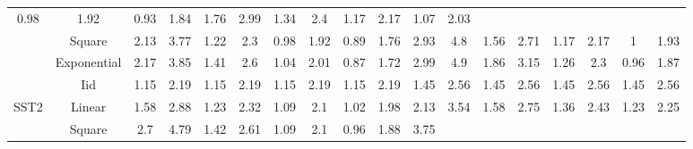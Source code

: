 \begin{table*}[t]
{\begin{tabular}{|c|c|cccccccc|cccccccc|}
  \multicolumn{1}{c|}{0.98} &
  \multicolumn{1}{c|}{1.92} &
  \multicolumn{1}{c|}{0.93} &
  1.84 &
  \multicolumn{1}{c|}{1.76} &
  \multicolumn{1}{c|}{2.99} &
  \multicolumn{1}{c|}{1.34} &
  \multicolumn{1}{c|}{2.4} &
  \multicolumn{1}{c|}{1.17} &
  \multicolumn{1}{c|}{2.17} &
  \multicolumn{1}{c|}{1.07} &
  2.03 \\
 &
  Square &
  \multicolumn{1}{c|}{2.13} &
  \multicolumn{1}{c|}{3.77} &
  \multicolumn{1}{c|}{1.22} &
  \multicolumn{1}{c|}{2.3} &
  \multicolumn{1}{c|}{0.98} &
  \multicolumn{1}{c|}{1.92} &
  \multicolumn{1}{c|}{0.89} &
  1.76 &
  \multicolumn{1}{c|}{2.93} &
  \multicolumn{1}{c|}{4.8} &
  \multicolumn{1}{c|}{1.56} &
  \multicolumn{1}{c|}{2.71} &
  \multicolumn{1}{c|}{1.17} &
  \multicolumn{1}{c|}{2.17} &
  \multicolumn{1}{c|}{1} &
  1.93 \\
 &
  Exponential &
  \multicolumn{1}{c|}{2.17} &
  \multicolumn{1}{c|}{3.85} &
  \multicolumn{1}{c|}{1.41} &
  \multicolumn{1}{c|}{2.6} &
  \multicolumn{1}{c|}{1.04} &
  \multicolumn{1}{c|}{2.01} &
  \multicolumn{1}{c|}{0.87} &
  1.72 &
  \multicolumn{1}{c|}{2.99} &
  \multicolumn{1}{c|}{4.9} &
  \multicolumn{1}{c|}{1.86} &
  \multicolumn{1}{c|}{3.15} &
  \multicolumn{1}{c|}{1.26} &
  \multicolumn{1}{c|}{2.3} &
  \multicolumn{1}{c|}{0.96} &
  1.87 \\ \hline
 &
  Iid &
  \multicolumn{1}{c|}{1.15} &
  \multicolumn{1}{c|}{2.19} &
  \multicolumn{1}{c|}{1.15} &
  \multicolumn{1}{c|}{2.19} &
  \multicolumn{1}{c|}{1.15} &
  \multicolumn{1}{c|}{2.19} &
  \multicolumn{1}{c|}{1.15} &
  2.19 &
  \multicolumn{1}{c|}{1.45} &
  \multicolumn{1}{c|}{2.56} &
  \multicolumn{1}{c|}{1.45} &
  \multicolumn{1}{c|}{2.56} &
  \multicolumn{1}{c|}{1.45} &
  \multicolumn{1}{c|}{2.56} &
  \multicolumn{1}{c|}{1.45} &
  2.56 \\
\multirow{2}{*}{SST2} &
  Linear &
  \multicolumn{1}{c|}{1.58} &
  \multicolumn{1}{c|}{2.88} &
  \multicolumn{1}{c|}{1.23} &
  \multicolumn{1}{c|}{2.32} &
  \multicolumn{1}{c|}{1.09} &
  \multicolumn{1}{c|}{2.1} &
  \multicolumn{1}{c|}{1.02} &
  1.98 &
  \multicolumn{1}{c|}{2.13} &
  \multicolumn{1}{c|}{3.54} &
  \multicolumn{1}{c|}{1.58} &
  \multicolumn{1}{c|}{2.75} &
  \multicolumn{1}{c|}{1.36} &
  \multicolumn{1}{c|}{2.43} &
  \multicolumn{1}{c|}{1.23} &
  2.25 \\
 &
  Square &
  \multicolumn{1}{c|}{2.7} &
  \multicolumn{1}{c|}{4.79} &
  \multicolumn{1}{c|}{1.42} &
  \multicolumn{1}{c|}{2.61} &
  \multicolumn{1}{c|}{1.09} &
  \multicolumn{1}{c|}{2.1} &
  \multicolumn{1}{c|}{0.96} &
  1.88 &
  \multicolumn{1}{c|}{3.75} &

\end{tabular}}
\end{table*}
